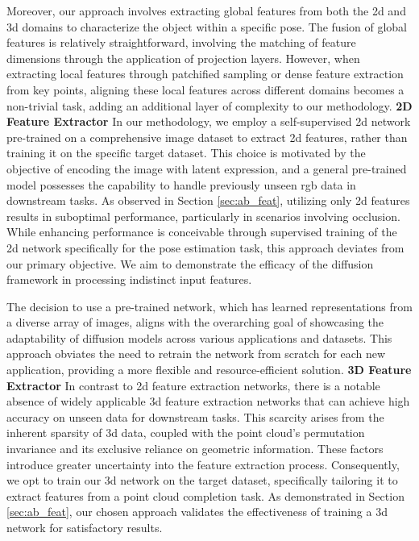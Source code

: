 \documentclass[12pt,DIV14,BCOR12mm,a4paper,footinclude=false,headinclude,parskip=half-,twoside,openright,cleardoublepage=empty,toc=index,bibliography=totoc,listof=totoc]{scrreprt}
\numberwithin{equation}{chapter}
\begin{document}
Moreover, our approach involves extracting global features from both the \gls{2d} and \gls{3d} domains to characterize the object within a specific pose. The fusion of global features is relatively straightforward, involving the matching of feature dimensions through the application of projection layers. However, when extracting local features through patchified sampling or dense feature extraction from key points, aligning these local features across different domains becomes a non-trivial task, adding an additional layer of complexity to our methodology.
\bigbreak
\textbf{2D Feature Extractor} \quad In our methodology, we employ a self-supervised \gls{2d} network pre-trained on a comprehensive image dataset to extract \gls{2d} features, rather than training it on the specific target dataset. This choice is motivated by the objective of encoding the image with latent expression, and a general pre-trained model possesses the capability to handle previously unseen \gls{rgb} data in downstream tasks. As observed in Section \ref{sec:ab_feat}, utilizing only \gls{2d} features results in suboptimal performance, particularly in scenarios involving occlusion. While enhancing performance is conceivable through supervised training of the \gls{2d} network specifically for the pose estimation task, this approach deviates from our primary objective. We aim to demonstrate the efficacy of the diffusion framework in processing indistinct input features.

The decision to use a pre-trained network, which has learned representations from a diverse array of images, aligns with the overarching goal of showcasing the adaptability of diffusion models across various applications and datasets. This approach obviates the need to retrain the network from scratch for each new application, providing a more flexible and resource-efficient solution.
\bigbreak
\textbf{3D Feature Extractor} \quad In contrast to \gls{2d} feature extraction networks, there is a notable absence of widely applicable \gls{3d} feature extraction networks that can achieve high accuracy on unseen data for downstream tasks. This scarcity arises from the inherent sparsity of \gls{3d} data, coupled with the point cloud's permutation invariance and its exclusive reliance on geometric information. These factors introduce greater uncertainty into the feature extraction process. Consequently, we opt to train our \gls{3d} network on the target dataset, specifically tailoring it to extract features from a point cloud completion task. As demonstrated in Section \ref{sec:ab_feat}, our chosen approach validates the effectiveness of training a \gls{3d} network for satisfactory results.
\end{document}
